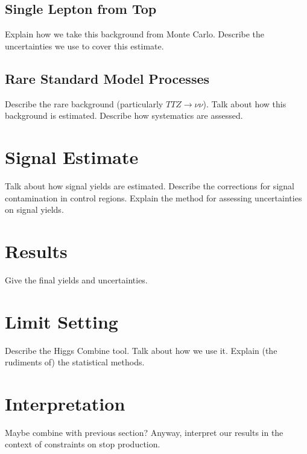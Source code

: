 \subsection{Single Lepton from Top}
\label{ssec:stop1ltop}

Explain how we take this background from Monte Carlo.
Describe the uncertainties we use to cover this estimate.

\subsection{Rare Standard Model Processes}
\label{ssec:stop1lrare}

Describe the rare background (particularly $TTZ \rightarrow \nu\nu$).
Talk about how this background is estimated.
Describe how systematics are assessed.

\section{Signal Estimate}
\label{sec:stopsignal}

Talk about how signal yields are estimated.
Describe the corrections for signal contamination in control regions.
Explain the method for assessing uncertainties on signal yields.

\section{Results}
\label{sec:stopresults}

Give the final yields and uncertainties.

\section{Limit Setting}
\label{sec:stoplimits}

Describe the Higgs Combine tool.
Talk about how we use it.
Explain (the rudiments of) the statistical methods.

\section{Interpretation}
\label{sec:stopinterp}

Maybe combine with previous section?
Anyway, interpret our results in the context of constraints on stop production.

